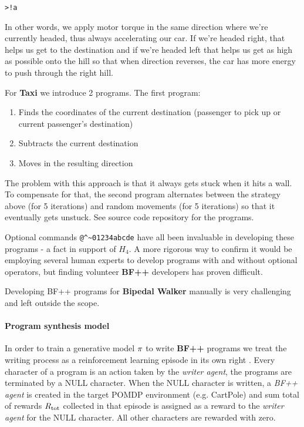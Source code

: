 \begin{center}
\begin{lstlisting}
>!a
\end{lstlisting}
\end{center}

In other words, we apply motor torque in the same direction where we're currently headed, thus always accelerating our car.
If we're headed right, that helps us get to the destination and if we're headed left that helps us get as high as possible onto the hill so that when direction reverses, the car has more energy to push through the right hill.

For \textbf{Taxi} we introduce 2 programs.
The first program:
\begin{enumerate}
    \item Finds the coordinates of the current destination (passenger to pick up or current passenger's destination)
    \item Subtracts the current destination 
    \item Moves in the resulting direction
\end{enumerate}

The problem with this approach is that it always gets stuck when it hits a wall.
To compensate for that, the second program alternates between the strategy above (for 5 iterations) and random movements (for 5 iterations) so that it eventually gets unstuck. See source code repository for the programs.

Optional commands \verb|@^~01234abcde| have all been invaluable in developing these programs - a fact in support of $H_4$.
A more rigorous way to confirm it would be employing several human experts to develop programs with and without optional operators, but finding volunteer \textbf{BF++} developers has proven difficult. 

Developing BF++ programs for \textbf{Bipedal Walker} manually is very challenging and left outside the scope.

\paragraph{Program synthesis model}

In order to train a generative model $\pi$ to write \textbf{BF++} programs we treat the writing process as a reinforcement learning episode in its own right \cite{abolafiaNeuralProgramSynthesis2018} .
Every character of a program is an action taken by the \emph{writer agent}, the programs are terminated by a NULL character.
When the NULL character is written, a \emph{BF++ agent} is created in the target POMDP environment (e.g. CartPole) and sum total of rewards $R_\text{tot}$ collected in that episode is assigned as a reward to the \emph{writer agent} for the NULL character.
All other characters are rewarded with zero.

